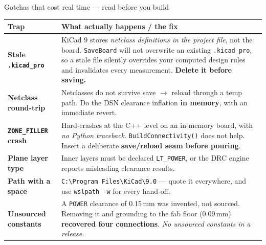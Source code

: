 \documentclass[aspectratio=169,10pt]{beamer}
\begin{document}
\begin{frame}{Gotchas that cost real time --- read before you build}
\vspace{1mm}
\begin{center}\scriptsize
\begin{tabular}{@{}p{} p{}@{}}
\toprule
\textbf{Trap} & \textbf{What actually happens / the fix}\\
\midrule
\textbf{Stale \texttt{.kicad\_pro}} &
KiCad 9 stores \emph{netclass definitions in the project file}, not the board. \texttt{SaveBoard} will not overwrite an existing \texttt{.kicad\_pro}, so a stale file silently overrides your computed design rules and invalidates every measurement. \textbf{Delete it before saving.}\\
\addlinespace
\textbf{Netclass round-trip} &
Netclasses do not survive save $\rightarrow$ reload through a temp path. Do the DSN clearance inflation \textbf{in memory}, with an immediate revert.\\
\addlinespace
\textbf{\texttt{ZONE\_FILLER} crash} &
Hard-crashes at the C++ level on an in-memory board, with \emph{no Python traceback}. \texttt{BuildConnectivity()} does not help. Insert a deliberate \textbf{save/reload seam before pouring}.\\
\addlinespace
\textbf{Plane layer type} &
Inner layers must be declared \texttt{LT\_POWER}, or the DRC engine reports misleading clearance results.\\
\addlinespace
\textbf{Path with a space} &
\texttt{C:\textbackslash Program Files\textbackslash KiCad\textbackslash 9.0} --- quote it everywhere, and use \texttt{wslpath -w} for every hand-off.\\
\addlinespace
\textbf{Unsourced constants} &
A \texttt{POWER} clearance of 0.15\,mm was invented, not sourced. Removing it and grounding to the fab floor (0.09\,mm) \textbf{recovered four connections}. \emph{No unsourced constants in a release.}\\
\bottomrule
\end{tabular}
\end{center}
\end{frame}
\end{document}

